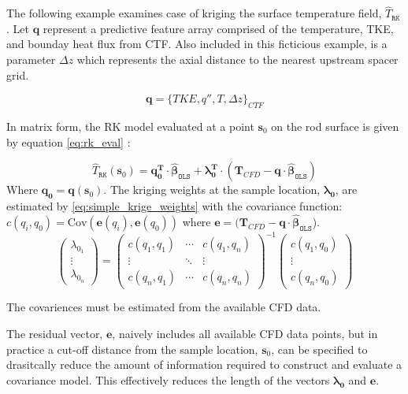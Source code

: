 The following example examines case of kriging the surface temperature field, $\hat T_\mathtt{RK}$.
Let $\mathbf{q}$ represent a predictive feature array comprised of the temperature,
TKE, and bounday heat flux from CTF.  Also included in this ficticious example, is a parameter $\Delta z$ which represents the axial distance to the nearest upstream spacer grid.

\begin{equation}
\mathbf{q} = \{TKE, q'', T, \Delta z \}_{CTF}
\end{equation}

In matrix form, the RK model evaluated at a point $\mathbf{s}_0 $ on the rod surface is given by equation \ref{eq:rk_eval} \cite{Hengl07}:

\begin{equation}
\hat T_\mathtt{RK}(\mathbf{s}_0 ) = \mathbf{q}_\mathbf{0}^\mathbf{T} \cdot \mathbf{\hat \beta}_\mathtt{OLS} + \mathbf{\lambda }_\mathbf{0}^\mathbf{T} \cdot (\mathbf T_{CFD}
- \mathbf{q} \cdot \mathbf{\hat \beta }_\mathtt{OLS} )
\label{eq:rk_eval}
\end{equation}
Where $\mathbf{q}_\mathbf{0}= \mathbf{q}(\mathbf s_0)$. The kriging weights at the sample location, $\mathbf{\lambda_0}$, are estimated by \ref{eq:simple_krige_weights} with the covariance function: $c(q_i, q_0)= \mathrm{Cov}(\mathbf e(q_i), \mathbf e(q_0))$ where $\mathbf e = (\mathbf T_{CFD} - \mathbf{q} \cdot \mathbf{\hat \beta }_\mathtt{OLS}$). 
\begin{equation}
\begin{pmatrix}\lambda_{0_1} \\ \vdots \\ \lambda_{0_n} \end{pmatrix}=
\begin{pmatrix}c(q_1,q_1) & \cdots & c(q_1,q_n) \\
\vdots & \ddots & \vdots  \\
c(q_n,q_1) & \cdots & c(q_n,q_n) 
\end{pmatrix}^{-1}
\begin{pmatrix}c(q_1,q_0) \\ \vdots \\ c(q_n,q_0) \end{pmatrix}
\label{eq:simple_krige_weights}
\end{equation}

The covariences must be estimated from the available CFD data.  

The residual vector, $\mathbf e$, naively includes all available CFD data points, but in practice a cut-off distance from the sample location, $\mathbf s_0$, can be specified to drasitcally reduce the amount of information required to construct and evaluate a covariance model.  This effectively reduces the length of the vectors $\mathbf{\lambda_0}$ and $\mathbf e$.

